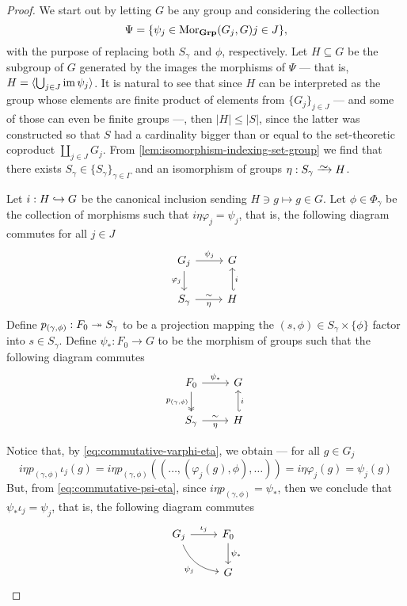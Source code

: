 \begin{proof}
We start out by letting \(G\) be any group and considering the collection
\[
  \Psi = \{\psi_{j} \in \operatorname{Mor}_{{\textbf{Grp}}}(G_j, G) \relax j \in J\},
\]
with the purpose of replacing both \(S_{\gamma}\) and \(\phi\),
respectively. Let \(H \subseteq G\) be the subgroup of \(G\) generated by the
images the morphisms of \(\Psi\) --- that is, \(H = \langle \bigcup_{j \in J}
\operatorname{im} \psi_j \rangle\). It is natural to see that since \(H\) can be interpreted
as the group whose elements are finite product of elements from \(\{G_{j}\}_{j
\in J}\) --- and some of those can even be finite groups ---, then \(|H| \leq
|S|\), since the latter was constructed so that \(S\) had a cardinality bigger
than or equal to the set-theoretic coproduct \(\coprod_{j \in J} G_j\). From
\cref{lem:isomorphism-indexing-set-group} we find that there exists \(S_{\gamma}
\in \{S_{\gamma}\}_{\gamma \in \Gamma}\) and an isomorphism of groups \(\eta:
S_{\gamma} \isoto H\).

Let \(i: H \hookrightarrow G\) be the canonical inclusion sending \(H \ni g \mapsto g \in
G\). Let \(\phi \in \Phi_{\gamma}\) be the collection of morphisms such that \(i
\eta \varphi_j = \psi_j\), that is, the following diagram commutes for all \(j
\in J\)
\begin{equation*}
\label{eq:commutative-varphi-eta}
  \begin{tikzcd}
    G_j \ar[r, "\psi_j"] \ar[d, swap, "\varphi_j"] &G \\
    S_{\gamma} \ar[r, "\eta"', "\sim"] &H \ar[u, hook', swap, "i"]
  \end{tikzcd}
\end{equation*}
Define \(p_{(\gamma, \phi)}: F_0 \twoheadrightarrow S_{\gamma}\) to be a projection mapping
the \((s, \phi) \in S_{\gamma} \times \{\phi\}\) factor into \(s \in
S_{\gamma}\). Define \(\psi_{*}: F_0 \to G\) to be the morphism of groups such
that the following diagram commutes
\begin{equation*}
\label{eq:commutative-psi-eta}
  \begin{tikzcd}
    F_0 \ar[d, two heads, swap, "p_{(\gamma, \phi)}"] \ar[r, "\psi_{*}"] &G \\
    S_{\gamma} \ar[r, "\sim", "\eta"'] &H \ar[u, hook', "i"']
  \end{tikzcd}
\end{equation*}

Notice that, by \cref{eq:commutative-varphi-eta}, we obtain --- for all \(g \in
G_j\)
\[
  i \eta p_{(\gamma, \phi)} \iota_j(g)
  = i \eta p_{(\gamma, \phi)}((\dots, (\varphi_j(g), \phi), \dots))
  = i \eta \varphi_j(g)
  = \psi_j(g)
\]
But, from \cref{eq:commutative-psi-eta}, since \(i \eta p_{(\gamma, \phi)} =
\psi_{*}\), then we conclude that \(\psi_{*} \iota_j = \psi_j\), that is, the
following diagram commutes
\[
  \begin{tikzcd}
    G_j \ar[r, "\iota_j"] \ar[dr, bend right, swap, "\psi_j"]
      &F_0 \ar[d, "\psi_{*}"] \\
    &G
  \end{tikzcd}
\]


\end{proof}

